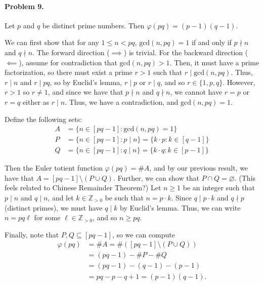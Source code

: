 \documentclass[12pt]{article}
\begin{document}
\paragraph{Problem 9.} Let $p$ and $q$ be distinct prime numbers. Then $\varphi(pq) = (p-1)(q-1)$. 
 
We can first show that for any $1 \le n < pq$, $\mathrm{gcd}(n, pq) = 1$ if and only if $p \nmid n$ and $q \nmid n$. The forward direction ($\implies$) is trivial. %
For the backward direction ($\impliedby$), assume for contradiction that $\mathrm{gcd}(n, pq) > 1$. Then, it must have a prime factorization, so there must exist a prime $r > 1$ such that $r \mid \mathrm{gcd}(n, pq)$. Thus, $r \mid n$ and $r \mid pq$, so by Euclid's lemma, $r \mid p$ or $r \mid q$, and so $r \in \{1, p, q\}$. However, $r > 1$ so $r \neq 1$, and since we have that $p \nmid n$ and $q \nmid n$, we cannot have $r = p$ or $r = q$ either as $r \mid n$. Thus, we have a contradiction, and $\mathrm{gcd}(n, pq) = 1$.
 
Define the following sets:
\begin{align*}
A &= \{n \in [pq - 1] : \mathrm{gcd}(n, pq) = 1\} \\
P &= \{ n \in [pq - 1] : p \mid n \} = \{ k \cdot p : k \in [q - 1] \} \\
Q &= \{ n \in [pq - 1] : q \mid n \} = \{  k \cdot q : k \in [p - 1] \}
\end{align*}

Then the Euler totient function $\varphi(pq) = \#A$, and by our previous result, we have that $A = [pq-1] \setminus (P \cup Q)$. Further, %
we can show that $P \cap Q = \varnothing$. (This feels related to Chinese Remainder Theorem?) Let $n \ge 1$ be an integer such that $p \mid n$ and $q \mid n$, and let $k \in \mathbb Z_{>0}$ be such that $n = p \cdot k$. Since $q \mid p \cdot k$ and $q \nmid p$ (distinct primes), we must have $q \mid k$ by Euclid's lemma. Thus, we can write $n = pq\ell$ for some $\ell \in \mathbb Z_{>0}$, and so $n \ge pq$. 

Finally, note that $P, Q \subseteq [pq - 1]$, so we can compute \begin{align*}\varphi(pq) &= \# A = \#([pq - 1] \setminus (P \cup Q))  \\ &= (pq - 1) - \#P - \#Q \\ &= (pq - 1) - (q-1) - (p - 1) \\ &= pq - p - q + 1 = (p - 1)(q - 1).
\end{align*}
\end{document}

